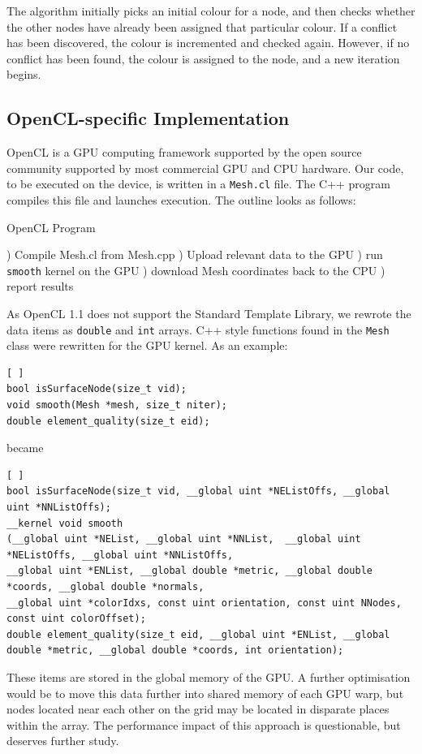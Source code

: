 \documentclass[a4paper,11pt, twocolumn]{article}
\begin{document}
The algorithm initially picks an initial colour for a node, and then checks whether the other nodes have already been assigned that particular colour. If a conflict has been discovered, the colour is incremented and checked again. However, if no conflict has been found, the colour is assigned to the node, and a new iteration begins.

\subsection{OpenCL-specific Implementation}
OpenCL is a GPU computing framework supported by the open source community supported by most commercial GPU and CPU hardware.
Our code, to be executed on the device, is written in a \verb+Mesh.cl+ file.
The C++ program compiles this file and launches execution.  The outline looks as follows:
\begin{algorithm}[H]
\caption{OpenCL Program}
\label{al:colour}
\begin{algorithmic}[1]
) Compile Mesh.cl from Mesh.cpp
) Upload relevant data to the GPU
) run \verb+smooth+ kernel on the GPU
) download Mesh coordinates back to the CPU
) report results
\end{algorithmic}
\end{algorithm}
As OpenCL 1.1 does not support the Standard Template Library, we rewrote the data items as \verb+double+ and \verb+int+ arrays.  C++ style functions found in the \verb+Mesh+ class were rewritten for the GPU kernel.  As an example:
\begin{lstlisting}[ ]
bool isSurfaceNode(size_t vid);
void smooth(Mesh *mesh, size_t niter);
double element_quality(size_t eid);
\end{lstlisting}

became

\begin{lstlisting}[ ]
bool isSurfaceNode(size_t vid, __global uint *NEListOffs, __global uint *NNListOffs);
__kernel void smooth
(__global uint *NEList, __global uint *NNList,  __global uint *NEListOffs, __global uint *NNListOffs,
__global uint *ENList, __global double *metric, __global double *coords, __global double *normals,
__global uint *colorIdxs, const uint orientation, const uint NNodes, const uint colorOffset);
double element_quality(size_t eid, __global uint *ENList, __global double *metric, __global double *coords, int orientation);
\end{lstlisting}
These items are stored in the global memory of the GPU.  A further optimisation would be to move this data further into shared memory of each GPU warp, but nodes located near each other on the grid may be located in disparate places within the array.  The performance impact of this approach is questionable, but deserves further study.
\end{document}
